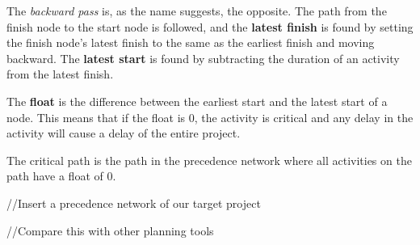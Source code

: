 \documentclass[../report.tex]{subfiles}
\begin{document}
The \textit{backward pass} is, as the name suggests, the opposite. The path from the finish node to the start node is followed, and the \textbf{latest finish} is found by setting the finish node's latest finish to the same as the earliest finish and moving backward. The \textbf{latest start} is found by subtracting the duration of an activity from the latest finish.

The \textbf{float} is the difference between the earliest start and the latest start of a node. This means that if the float is 0, the activity is critical and any delay in the activity will cause a delay of the entire project.

The critical path is the path in the precedence network where all activities on the path have a float of 0. 

//Insert a precedence network of our target project

//Compare this with other planning tools
\end{document}
